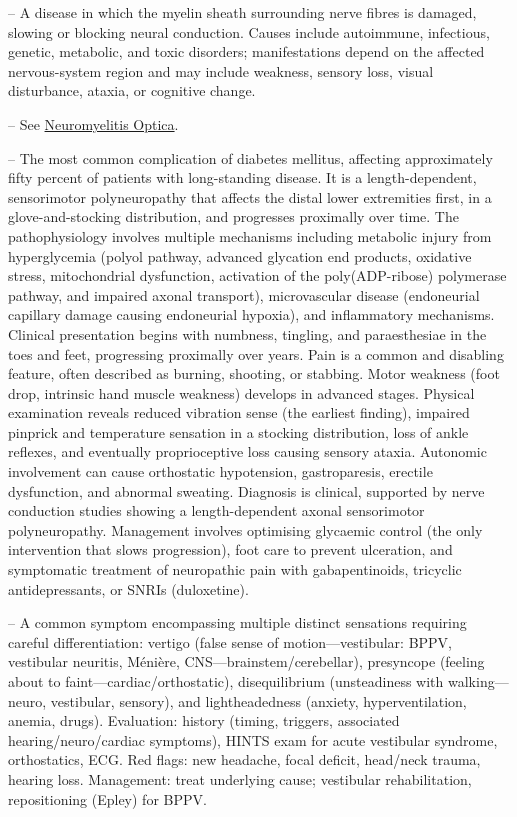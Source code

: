 -- A disease in which the myelin sheath surrounding nerve fibres is damaged, slowing or blocking neural conduction. Causes include autoimmune, infectious, genetic, metabolic, and toxic disorders; manifestations depend on the affected nervous-system region and may include weakness, sensory loss, visual disturbance, ataxia, or cognitive change.

-- See \hyperlink{Neuromyelitis Optica}{Neuromyelitis Optica}.

-- The most common complication of diabetes mellitus, affecting approximately fifty percent of patients with long-standing disease. It is a length-dependent, sensorimotor polyneuropathy that affects the distal lower extremities first, in a glove-and-stocking distribution, and progresses proximally over time. The pathophysiology involves multiple mechanisms including metabolic injury from hyperglycemia (polyol pathway, advanced glycation end products, oxidative stress, mitochondrial dysfunction, activation of the poly(ADP-ribose) polymerase pathway, and impaired axonal transport), microvascular disease (endoneurial capillary damage causing endoneurial hypoxia), and inflammatory mechanisms. Clinical presentation begins with numbness, tingling, and paraesthesiae in the toes and feet, progressing proximally over years. Pain is a common and disabling feature, often described as burning, shooting, or stabbing. Motor weakness (foot drop, intrinsic hand muscle weakness) develops in advanced stages. Physical examination reveals reduced vibration sense (the earliest finding), impaired pinprick and temperature sensation in a stocking distribution, loss of ankle reflexes, and eventually proprioceptive loss causing sensory ataxia. Autonomic involvement can cause orthostatic hypotension, gastroparesis, erectile dysfunction, and abnormal sweating. Diagnosis is clinical, supported by nerve conduction studies showing a length-dependent axonal sensorimotor polyneuropathy. Management involves optimising glycaemic control (the only intervention that slows progression), foot care to prevent ulceration, and symptomatic treatment of neuropathic pain with gabapentinoids, tricyclic antidepressants, or SNRIs (duloxetine).

-- A common symptom encompassing multiple distinct sensations requiring careful differentiation: vertigo (false sense of motion—vestibular: BPPV, vestibular neuritis, Ménière, CNS—brainstem/cerebellar), presyncope (feeling about to faint—cardiac/orthostatic), disequilibrium (unsteadiness with walking—neuro, vestibular, sensory), and lightheadedness (anxiety, hyperventilation, anemia, drugs). Evaluation: history (timing, triggers, associated hearing/neuro/cardiac symptoms), HINTS exam for acute vestibular syndrome, orthostatics, ECG. Red flags: new headache, focal deficit, head/neck trauma, hearing loss. Management: treat underlying cause; vestibular rehabilitation, repositioning (Epley) for BPPV.


